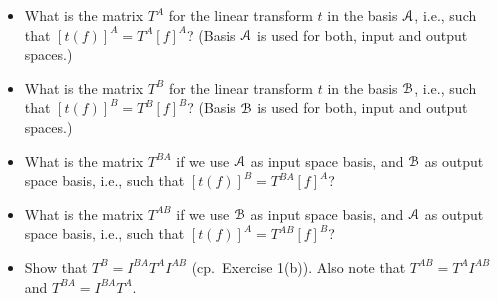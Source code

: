 \begin{enumerate}
\begin{itemize}
\item What is the matrix $T^A$ for the linear transform $t$ in the basis $\AA$, i.e., such that $[t(f)]^A = T^A [f]^A$? (Basis $\AA$ is used for both, input and output spaces.)
\item What is the matrix $T^B$ for the linear transform $t$ in the basis $\BB$, i.e., such that $[t(f)]^B = T^B [f]^B$? (Basis $\BB$ is used for both, input and output spaces.)
\item What is the matrix $T^{BA}$ if we use $\AA$ as input space basis, and $\BB$ as output space basis, i.e., such that $[t(f)]^B = T^{BA} [f]^A$?
\item What is the matrix $T^{AB}$ if we use $\BB$ as input space basis, and $\AA$ as output space basis, i.e., such that $[t(f)]^A = T^{AB} [f]^B$?
\item Show that $T^B = I^{BA} T^A I^{AB}$ (cp.\ Exercise 1(b)). Also note that $T^{AB} = T^A I^{AB}$ and $T^{BA} = I^{BA} T^A$.
\end{itemize}




\end{enumerate}




\exerfoot
